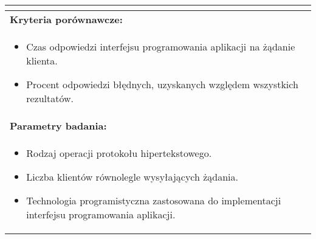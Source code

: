 \begin{longtable}[c]{|llll|}
{\begin{itemize}[label={}]
          \end{itemize}
    }                                                           \\ \hline
    \multicolumn{4}{|l|}{\textbf{Kryteria porównawcze:}}                             \\ \hline
    \multicolumn{4}{|p{\linewidth}|}{
        \begin{itemize}
            \item Czas odpowiedzi interfejsu programowania aplikacji na żądanie klienta.
            \item Procent odpowiedzi błędnych, uzyskanych względem wszystkich rezultatów.
        \end{itemize}
    }                                                           \\ \hline
    \multicolumn{4}{|l|}{\textbf{Parametry badania:}}                                \\ \hline
    \multicolumn{4}{|p{\linewidth}|}{
        \begin{itemize}
            \item Rodzaj operacji protokołu hipertekstowego.
            \item Liczba klientów równolegle wysyłających żądania.
            \item Technologia programistyczna zastosowana do implementacji interfejsu programowania aplikacji.
        \end{itemize}
    }                                                           \\ \hline
\end{longtable}


